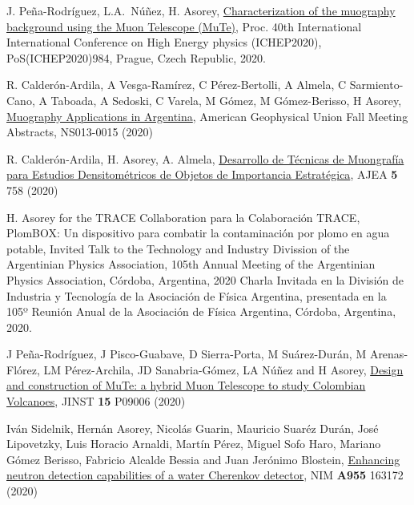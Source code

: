 \begin{etaremune}
\item {} J. Peña-Rodríguez, L.A.\ Núñez, H. Asorey, \href{https://doi.org/10.22323/1.390.0984}{Characterization of the muography background using the Muon Telescope (MuTe)}, \en Proc.
40th International International Conference on High Energy physics (ICHEP2020), PoS(ICHEP2020)984, Prague,  Czech Republic, 2020. %

\item {} R. Calderón-Ardila, A Vesga-Ramírez, C Pérez-Bertolli, A Almela, C Sarmiento-Cano, A Taboada, A Sedoski, C Varela, M Gómez, M Gómez-Berisso, H Asorey, \href{https://ui.adsabs.harvard.edu/abs/2020AGUFMNS0130015C/abstract}{Muography Applications in Argentina}, American Geophysical Union Fall Meeting Abstracts, NS013-0015 (2020)

\item {} R. Calderón-Ardila, H. Asorey, A. Almela, \href{https://doi.org/10.33414/ajea.5.758.2020}{Desarrollo de Técnicas de Muongrafía para Estudios Densitométricos de Objetos de Importancia Estratégica}, AJEA {\textbf{5}} 758 (2020)

\item {} H. Asorey \ifeng for the TRACE Collaboration \else para la Colaboración TRACE\fi, PlomBOX: Un dispositivo para combatir la contaminación por plomo en agua potable, \ifeng Invited Talk to the Technology and Industry Divission of the Argentinian Physics Association, 105th Annual Meeting of the Argentinian Physics Association, Córdoba, Argentina, 2020 \else Charla Invitada en la División de Industria y Tecnología de la Asociación de Física Argentina, presentada en la 105º Reunión Anual de la Asociación de Física Argentina, Córdoba, Argentina, 2020.\fi

\item {} J Peña-Rodríguez, J Pisco-Guabave, D Sierra-Porta, M Suárez-Durán, M Arenas-Flórez, LM Pérez-Archila, JD Sanabria-Gómez, LA Núñez and H Asorey, \href{https://doi.org/10.1088/1748-0221/15/09/P09006}{{Design and construction of MuTe: a hybrid Muon Telescope to study Colombian Volcanoes}}, JINST {\textbf{15}} P09006 (2020)%

\item {} Iván Sidelnik, Hernán Asorey, Nicolás Guarin, Mauricio Suaréz Durán, José Lipovetzky, Luis Horacio Arnaldi, Martín Pérez, Miguel Sofo Haro, Mariano Gómez Berisso, Fabricio Alcalde Bessia and Juan Jerónimo Blostein, \href{https://doi.org/10.1016/j.nima.2019.163172}{{Enhancing neutron detection capabilities of a water Cherenkov detector}}, NIM {\textbf{A955}} 163172 (2020) %


\end{etaremune}

